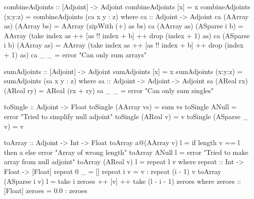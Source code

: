     \begin{haskell}[caption=Functions to transform and combine adjoints, label=lst:combine, gobble=8]
        combineAdjoints :: [Adjoint] -> Adjoint
        combineAdjoints [x]     = x
        combineAdjoints (x:y:z) = combineAdjoints (ca x y : z)
            where
                ca :: Adjoint -> Adjoint
                ca (AArray as) (AArray bs)   = AArray (zipWith (+) as bs)
                ca (AArray as) (ASparse i b) = AArray
                    (take index as ++ [as !! index + b] ++ drop (index + 1) as)
                ca (ASparse i b) (AArray as) = AArray
                    (take index as ++ [as !! index + b] ++ drop (index + 1) as)
                ca _           _             = error "Can only sum arrays"
        
        sumAdjoints :: [Adjoint] -> Adjoint
        sumAdjoints [x]     = x
        sumAdjoints (x:y:z) = sumAdjoints (sa x y : z)
            where
                sa :: Adjoint -> Adjoint -> Adjoint
                sa (AReal rx) (AReal ry) = AReal (rx + ry)
                sa _          _          = error "Can only sum singles"

        toSingle :: Adjoint -> Float
        toSingle (AArray vs)   = sum vs
        toSingle ANull         = error "Tried to simplify null adjoint"
        toSingle (AReal v)     = v
        toSingle (ASparse _ v) = v

        toArray :: Adjoint -> Int -> Float
        toArray a@(AArray v) l =
            if   length v == l
            then a
            else error "Array of wrong length"
        toArray ANull        l = error "Tried to make array from null adjoint"
        toArray (AReal v)    l = repeat l v
            where
                repeat :: Int -> Float -> [Float]
                repeat 0 _ = []
                repeat i v = v : repeat (i - 1) v
        toArray (ASparse i v) l = take i zeroes ++ [v] ++ take (l - i - 1) zeroes
            where
                zeroes :: [Float]
                zeroes = 0.0 : zeroes
    \end{haskell}